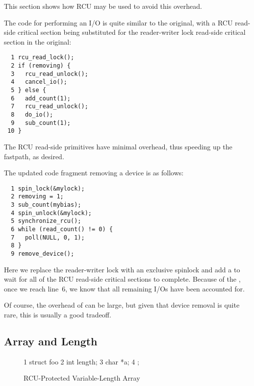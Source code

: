 This section shows how RCU may be used to avoid this overhead.

The code for performing an I/O is quite similar to the original, with
a RCU read-side critical section being substituted for the reader-writer
lock read-side critical section in the original:

\vspace{5pt}
\begin{minipage}[t]{\columnwidth}
\small
\begin{verbatim}
  1 rcu_read_lock();
  2 if (removing) {
  3   rcu_read_unlock();
  4   cancel_io();
  5 } else {
  6   add_count(1);
  7   rcu_read_unlock();
  8   do_io();
  9   sub_count(1);
 10 }
\end{verbatim}
\end{minipage}
\vspace{5pt}

The RCU read-side primitives have minimal overhead, thus speeding up
the fastpath, as desired.

The updated code fragment removing a device is as follows:

\vspace{5pt}
\begin{minipage}[t]{\columnwidth}
\small
\begin{verbatim}
  1 spin_lock(&mylock);
  2 removing = 1;
  3 sub_count(mybias);
  4 spin_unlock(&mylock);
  5 synchronize_rcu();
  6 while (read_count() != 0) {
  7   poll(NULL, 0, 1);
  8 }
  9 remove_device();
\end{verbatim}
\end{minipage}
\vspace{5pt}

Here we replace the reader-writer lock with an exclusive spinlock and
add a  to wait for all of the RCU read-side
critical sections to complete.
Because of the ,
once we reach line~6, we know that all remaining I/Os have been accounted
for.

Of course, the overhead of  can be large,
but given that device removal is quite rare, this is usually a good
tradeoff.

\subsection{Array and Length}
\label{sec:together:Array and Length}

\begin{figure}[tbp]
{ \scriptsize
\begin{verbbox}
 1 struct foo {
 2   int length;
 3   char *a;
 4 };
\end{verbbox}
}
\centering
\theverbbox
\caption{RCU-Protected Variable-Length Array}
\label{fig:together:RCU-Protected Variable-Length Array}
\end{figure}

